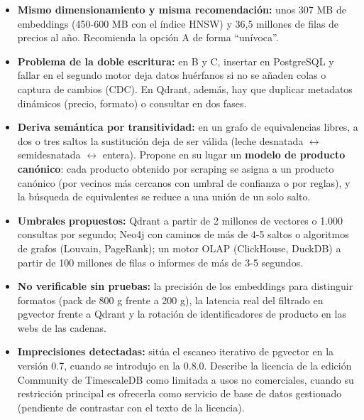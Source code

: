 \begin{tcolorbox}[colback=responsecolor, title=Insights de Gemini, colframe=gray!60!black, breakable]
	\begin{itemize}
		\item \textbf{Mismo dimensionamiento y misma recomendación:} unos 307 MB de embeddings (450-600 MB con el índice HNSW) y 36,5 millones de filas de precios al año. Recomienda la opción A de forma ``unívoca''.

		\item \textbf{Problema de la doble escritura:} en B y C, insertar en PostgreSQL y fallar en el segundo motor deja datos huérfanos si no se añaden colas o captura de cambios (CDC). En Qdrant, además, hay que duplicar metadatos dinámicos (precio, formato) o consultar en dos fases.

		\item \textbf{Deriva semántica por transitividad:} en un grafo de equivalencias libres, a dos o tres saltos la sustitución deja de ser válida (leche desnatada $\leftrightarrow$ semidesnatada $\leftrightarrow$ entera). Propone en su lugar un \textbf{modelo de producto canónico}: cada producto obtenido por scraping se asigna a un producto canónico (por vecinos más cercanos con umbral de confianza o por reglas), y la búsqueda de equivalentes se reduce a una unión de un solo salto.

		\item \textbf{Umbrales propuestos:} Qdrant a partir de 2 millones de vectores o 1.000 consultas por segundo; Neo4j con caminos de más de 4-5 saltos o algoritmos de grafos (Louvain, PageRank); un motor OLAP (ClickHouse, DuckDB) a partir de 100 millones de filas o informes de más de 3-5 segundos.

		\item \textbf{No verificable sin pruebas:} la precisión de los embeddings para distinguir formatos (pack de 800 g frente a 200 g), la latencia real del filtrado en pgvector frente a Qdrant y la rotación de identificadores de producto en las webs de las cadenas.

		\item \textbf{Imprecisiones detectadas:} sitúa el escaneo iterativo de pgvector en la versión 0.7, cuando se introdujo en la 0.8.0. Describe la licencia de la edición Community de TimescaleDB como limitada a usos no comerciales, cuando su restricción principal es ofrecerla como servicio de base de datos gestionado (pendiente de contrastar con el texto de la licencia).
	\end{itemize}
\end{tcolorbox}

